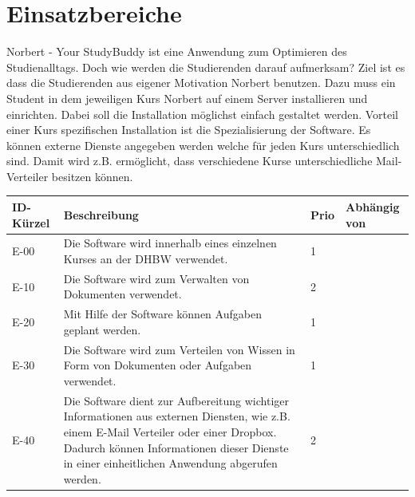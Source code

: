 
\chapter{Einsatzbereiche}
Norbert - Your StudyBuddy ist eine Anwendung zum Optimieren des Studienalltags. Doch wie werden die Studierenden darauf aufmerksam?
Ziel ist es dass die Studierenden aus eigener Motivation Norbert benutzen. Dazu muss ein Student in dem jeweiligen Kurs Norbert auf einem Server installieren und einrichten.
Dabei soll die Installation möglichst einfach gestaltet werden.
Vorteil einer Kurs spezifischen Installation ist die Spezialisierung der Software. Es können externe Dienste angegeben werden welche für jeden Kurs unterschiedlich sind. Damit wird z.B. ermöglicht, dass verschiedene Kurse unterschiedliche Mail-Verteiler besitzen können.

\begin{tabularx}{\textwidth}{|l|X|l|l|}
    \toprule
    \textbf{ID-Kürzel} & \textbf{Beschreibung} & \textbf{Prio} & \textbf{Abhängig von}\\
    \midrule
    \endhead
    \hline
    \caption{Einsatzbereiche}
    \label{Einsatzbereiche:tabelle}
    \endfoot
    E-00 & Die Software wird innerhalb eines einzelnen Kurses an der DHBW verwendet. & 1 & \\
    E-10 & Die Software wird zum Verwalten von Dokumenten verwendet. & 2 & \\
    E-20 & Mit Hilfe der Software können Aufgaben geplant werden. & 1 & \\
    E-30 & Die Software wird zum Verteilen von Wissen in Form von Dokumenten oder Aufgaben verwendet. & 1 & \\
    E-40 & Die Software dient zur Aufbereitung wichtiger Informationen aus externen Diensten, wie z.B. einem E-Mail Verteiler oder einer Dropbox. Dadurch können Informationen dieser Dienste in einer einheitlichen Anwendung abgerufen werden. & 2 & \\
\end{tabularx}


